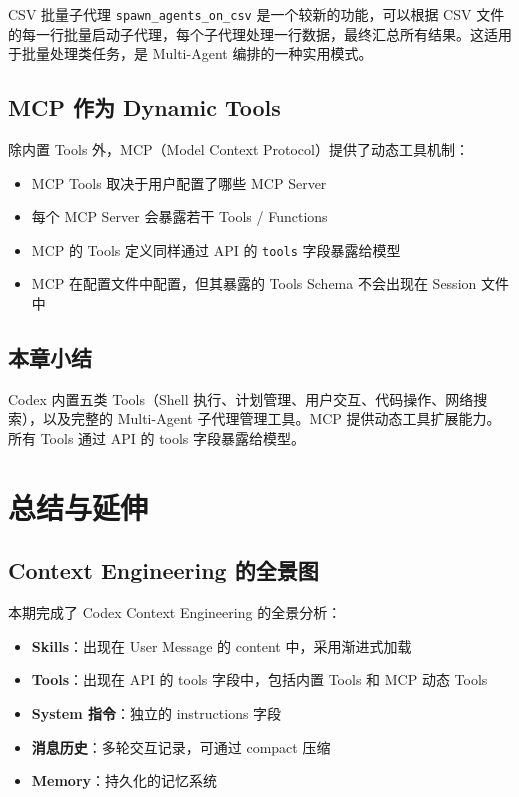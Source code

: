 \documentclass[a4paper]{article}
\begin{document}
\begin{knowledgebox}{CSV 批量子代理}
\texttt{spawn\_agents\_on\_csv} 是一个较新的功能，可以根据 CSV 文件的每一行批量启动子代理，每个子代理处理一行数据，最终汇总所有结果。这适用于批量处理类任务，是 Multi-Agent 编排的一种实用模式。
\end{knowledgebox}

\subsection{MCP 作为 Dynamic Tools}

除内置 Tools 外，MCP（Model Context Protocol）提供了动态工具机制：

\begin{itemize}
    \item MCP Tools 取决于用户配置了哪些 MCP Server
    \item 每个 MCP Server 会暴露若干 Tools / Functions
    \item MCP 的 Tools 定义同样通过 API 的 \texttt{tools} 字段暴露给模型
    \item MCP 在配置文件中配置，但其暴露的 Tools Schema 不会出现在 Session 文件中
\end{itemize}

\subsection{本章小结}

Codex 内置五类 Tools（Shell 执行、计划管理、用户交互、代码操作、网络搜索），以及完整的 Multi-Agent 子代理管理工具。MCP 提供动态工具扩展能力。所有 Tools 通过 API 的 tools 字段暴露给模型。


\section{总结与延伸}

\subsection{Context Engineering 的全景图}

本期完成了 Codex Context Engineering 的全景分析：

\begin{itemize}
    \item \textbf{Skills}：出现在 User Message 的 content 中，采用渐进式加载
    \item \textbf{Tools}：出现在 API 的 tools 字段中，包括内置 Tools 和 MCP 动态 Tools
    \item \textbf{System 指令}：独立的 instructions 字段
    \item \textbf{消息历史}：多轮交互记录，可通过 compact 压缩
    \item \textbf{Memory}：持久化的记忆系统
\end{itemize}
\end{document}
